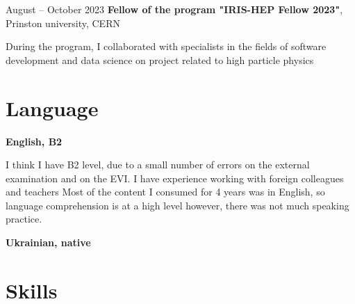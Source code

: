 \documentclass[10pt, letterpaper]{article}
\begin{document}
     
        \begin{twocolentry}{
            August – October 2023
        }
            \textbf{Fellow of the program "IRIS-HEP Fellow 2023"}, Prinston university, CERN \end{twocolentry}

        \vspace{0.10 cm}
        \begin{onecolentry}
            During the program, I collaborated with specialists in the fields of software development and data science on project related to high particle physics
        \end{onecolentry}

    \section{Language}
        

        \begin{samepage}
            \textbf{English, B2}


            I think I have B2 level, due to a small number of errors on the external examination and on the EVI. 
            I have experience working with foreign colleagues and teachers Most of the content I consumed for 4 years was in English, so language comprehension is at a high level however, there was not much speaking practice.


            \textbf{Ukrainian, native}

        \end{samepage}

    \section{Skills}
\end{document}
